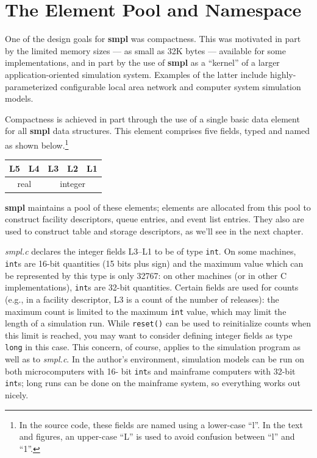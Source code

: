 \section{The Element Pool and Namespace}

One of the design goals for \textbf{smpl} was compactness. This was motivated in
part by the limited memory sizes --- as small as 32K bytes --- available for
some implementations, and in part by the use of \textbf{smpl} as a ``kernel'' of a larger
application-oriented simulation system. Examples of the latter include
highly-parameterized configurable local area network and computer system
simulation models.

Compactness is achieved in part through the use of a single basic data
element for all \textbf{smpl} data structures. This element comprises five fields,
typed and named as shown below.\footnote{In the source code, these fields are named using a lower-case ``l''. In the text and figures, an upper-case ``L'' is used to avoid confusion between ``l'' and ``1''.}

\begin{center}
\begin{tabular}{|c|c|c|c|c|}\hline
L5 & L4 & L3 & L2 & L1 \\ \hline
\multicolumn{2}{c}{real} & \multicolumn{3}{c}{integer}
\end{tabular}
\end{center}

\textbf{smpl} maintains a pool of these elements; elements are allocated from this
pool to construct facility descriptors, queue entries, and event list entries.
They also are used to construct table and storage descriptors, as we'll see in
the next chapter.

\textit{smpl.c} declares the integer fields L3--L1 to be of type \texttt{int}. On some
machines, \texttt{int}s are 16-bit quantities (15 bits plus sign) and the maximum
value which can be represented by this type is only 32767: on other machines
(or in other C implementations), \texttt{int}s are 32-bit quantities. Certain fields
are used for counts (e.g., in a facility descriptor, L3 is a count of the number of
releases): the maximum count is limited to the maximum \texttt{int} value, which
may limit the length of a simulation run. While \texttt{reset()} can be used to reinitialize
counts when this limit is reached, you may want to consider
defining integer fields as type \texttt{long} in this case. This concern, of course,
applies to the simulation program as well as to \textit{smpl.c}. In the author's
environment, simulation models can be run on both microcomputers with 16-
bit \texttt{int}s and mainframe computers with 32-bit \texttt{int}s; long runs can be done on
the mainframe system, so everything works out nicely.

